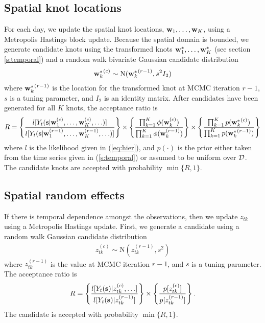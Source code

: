 \documentclass[11pt]{article}
\begin{document}
\subsection*{Spatial knot locations}
For each day, we update the spatial knot locations, $\mbox{\bf w}_1, \ldots, \mbox{\bf w}_K$, using a Metropolis Hastings block update.
Because the spatial domain is bounded, we generate candidate knots using the transformed knots $\mbox{\bf w}^*_1, \ldots, \mbox{\bf w}^*_K$ (see section \ref{s:temporal}) and a random walk bivariate Gaussian candidate distribution
\begin{align*}
	{ \mbox{\bf w}^*_k}^{(c)} \sim \text{N}({\mbox{\bf w}^*_k}^{(r - 1)}, s^2 I_2)
\end{align*}
where ${\mbox{\bf w}^*_k}^{(r - 1)}$ is the location for the transformed knot at MCMC iteration $r - 1$, $s$ is a tuning parameter, and $I_2$ is an identity matrix.
After candidates have been generated for all $K$ knots, the acceptance ratio is
\begin{align*}
  R = \left\{ \frac{ l[ Y_t(\mbox{\bf s} | \mbox{\bf w}_1^{(c)}, \ldots, \mbox{\bf w}_K^{(c)}, \ldots)] }{l[ Y_t(\mbox{\bf s} | \mbox{\bf w}_1^{(r - 1)}, \ldots, \mbox{\bf w}_K^{(r - 1)}, \ldots)]} \right\} \times \left\{ \frac{ \prod_{k = 1}^{K}\phi(\mbox{\bf w}_k^{(c)})}{ \prod_{k = 1}^{K}\phi(\mbox{\bf w}_k^{(r - 1)})} \right\} \times \left\{ \frac{ \prod_{k = 1}^{K} p({\mbox{\bf w}^*_k}^{(c)})}{ \prod_{k = 1}^{K} p({\mbox{\bf w}^*_k}^{(r - 1)})}\right\}
\end{align*}
where $l$ is the likelihood given in (\ref{eq:hier}), and $p(\cdot)$ is the prior either taken from the time series given in (\ref{s:temporal}) or assumed to be uniform over ${\cal D}$.
The candidate knots are accepted with probability $\min\{R, 1\}$.

\subsection*{Spatial random effects}
If there is temporal dependence amongst the observations, then we update $z_{tk}$ using a Metropolis Hastings update.
First, we generate a candidate using a random walk Gaussian candidate distribution
\begin{align*}
  z_{tk}^{(c)} \sim \text{N}(z_{tk}^{(r - 1)}, s^2)
\end{align*}
where $z_{tk}^{(r-1)}$ is the value at MCMC iteration $r - 1$, and $s$ is a tuning parameter.
The acceptance ratio is
\begin{align*}
  R = \left\{ \frac{ l[Y_t(\mbox{\bf s}) | z_{tk}^{(c)}, \ldots] }{ l[Y_t(\mbox{\bf s}) | z_{tk}^{(r - 1)}]} \right\} \times \left\{ \frac{ p[ z_{tk}^{(c)} ] }{ p[ z_{tk}^{(r - 1)}]}\right\}.
\end{align*}
The candidate is accepted with probability $\min\{R, 1\}$.
\end{document}
